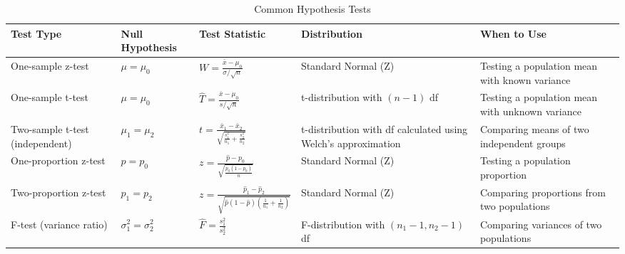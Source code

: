 \documentclass{article}
\begin{document}
\begin{table}[H]
\centering
\begin{tabular}{|p{3cm}|p{2.5cm}|p{4cm}|p{2.5cm}|p{4cm}|}
\hline
\textbf{Test Type} & \textbf{Null Hypothesis} & \textbf{Test Statistic} & \textbf{Distribution} & \textbf{When to Use} \\
\hline
One-sample z-test & $\mu = \mu_0$ & $W = \frac{\bar{x} - \mu_0}{\sigma/\sqrt{n}}$ & Standard Normal (Z) & Testing a population mean with known variance \\
\hline
One-sample t-test & $\mu = \mu_0$ & $\hat{T} = \frac{\bar{x} - \mu_0}{s/\sqrt{n}}$ & t-distribution with $(n-1)$ df & Testing a population mean with unknown variance \\
\hline
Two-sample t-test (independent) & $\mu_1 = \mu_2$ & $t = \frac{\bar{x}_1 - \bar{x}_2}{\sqrt{\frac{s_1^2}{n_1} + \frac{s_2^2}{n_2}}}$ & t-distribution with df calculated using Welch's approximation & Comparing means of two independent groups \\
\hline
One-proportion z-test & $p = p_0$ & $z = \frac{\hat{p} - p_0}{\sqrt{\frac{p_0(1-p_0)}{n}}}$ & Standard Normal (Z) & Testing a population proportion \\
\hline
Two-proportion z-test & $p_1 = p_2$ & $z = \frac{\hat{p}_1 - \hat{p}_2}{\sqrt{\hat{p}(1-\hat{p})(\frac{1}{n_1} + \frac{1}{n_2})}}$ & Standard Normal (Z) & Comparing proportions from two populations \\
\hline
F-test (variance ratio) & $\sigma_1^2 = \sigma_2^2$ & $\hat{F} = \frac{s_1^2}{s_2^2}$ & F-distribution with $(n_1-1, n_2-1)$ df & Comparing variances of two populations \\
\hline
\end{tabular}
\caption{Common Hypothesis Tests}
\end{table}
\end{document}
